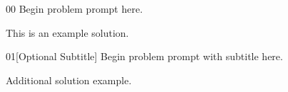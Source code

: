 \makeatletter
{}
\makeatother
\def\HomeworkDocOptions{11pt,letterpaper}

\HomeworkDocumentBegin



\begin{autohwproblem}{00}
Begin problem prompt here.
\end{autohwproblem}

\begin{solutionbox}
This is an example solution.
\end{solutionbox}

\begin{autohwproblem}{01}[Optional Subtitle]
Begin problem prompt with subtitle here.
  \end{autohwproblem}

\begin{solutionbox}
Additional solution example.
\end{solutionbox}

\HomeworkDocumentEnd
